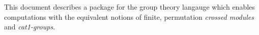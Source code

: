 
\newcommand{\semidirect}{\hspace{0.3em}\rule[0.03em]{0.05em}{0.45em}
                         \hspace{-0.35em}  \times  }


%



This document describes a package for the {\GAP} group theory langauge
which  enables computations with    the equivalent notions  of finite,
permutation {\em crossed modules} and {\em cat1-groups}.

